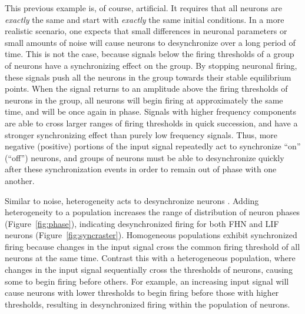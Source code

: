 \documentclass[12pt]{article}
\begin{document}
This previous example is, of course, artificial. It requires that all neurons are \emph{exactly} the same and start with \emph{exactly} the same initial conditions. In a more realistic scenario, one expects that small differences in neuronal parameters or small amounts of noise will cause neurons to desynchronize over a long period of time. This is not the case, because signals below the firing thresholds of a group of neurons have a synchronizing effect on the group. By stopping neuronal firing, these signals push all the neurons in the group towards their stable equilibrium points. When the signal returns to an amplitude above the firing thresholds of neurons in the group, all neurons will begin firing at approximately the same time, and will be once again in phase. Signals with higher frequency components are able to cross larger ranges of firing thresholds in quick succession, and have a stronger synchronizing effect than purely low frequency signals. Thus, more negative (positive) portions of the input signal repeatedly act to synchronize ``on'' (``off'') neurons, and groups of neurons must be able to desynchronize quickly after these synchronization events in order to remain out of phase with one another.

Similar to noise,
heterogeneity acts to desynchronize neurons \citep{Burton2012}.
Adding heterogeneity to a population
increases the range of distribution of neuron phases (Figure~\ref{fig:phase}),
indicating desynchronized firing
for both FHN and LIF neurons (Figure~\ref{fig:syncraster}).
Homogeneous populations exhibit synchronized firing
because changes in the input signal cross the common firing threshold
of all neurons at the same time.
Contrast this with a heterogeneous population,
where changes in the input signal
sequentially cross the thresholds of neurons,
causing some to begin firing before others.
For example, an increasing input signal
will cause neurons with lower thresholds
to begin firing before those with higher thresholds,
resulting in desynchronized firing within the population of neurons.
\end{document}
